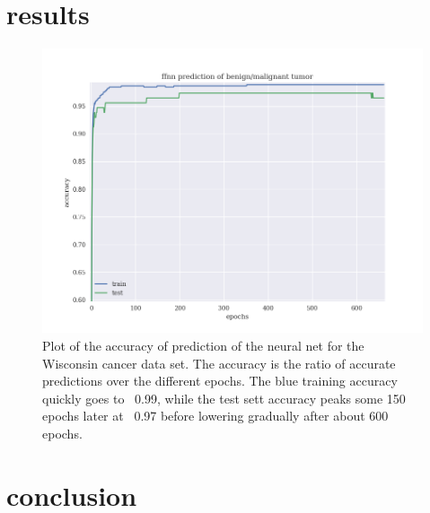 \documentclass[10pt]{article}
\begin{document}

\section{results}

\begin{figure}[hbtp]
\includegraphics[scale=.6]{../ffnnaccuracy.png}
\caption{Plot of the accuracy of prediction of the neural net for the Wisconsin
	cancer data set.  The accuracy is the ratio of accurate predictions over
	the different epochs. The blue training accuracy quickly goes to ~0.99,
	while the test sett accuracy peaks some 150 epochs later at ~0.97 before
	lowering gradually after about 600 epochs.}
\label{fig:ffnnaccuracy}
\end{figure}

\blindtext

\section{conclusion}

\blindtext



%
\end{document}
